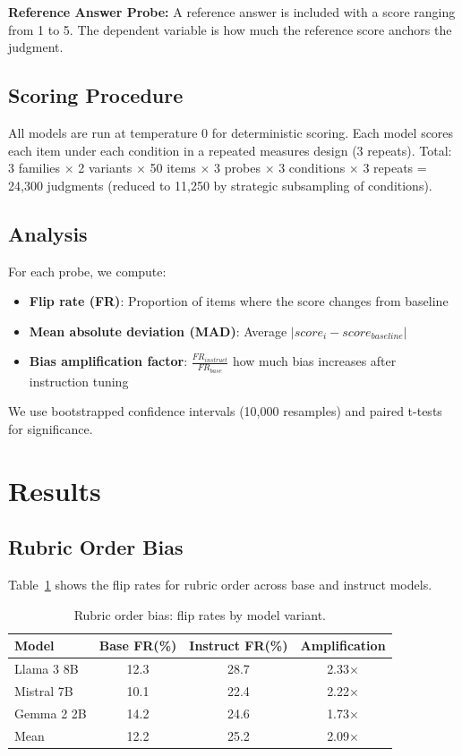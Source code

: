 \documentclass[11pt,twocolumn]{article}
\begin{document}
\textbf{Reference Answer Probe:} A reference answer is included with a score ranging from 1 to 5. The dependent variable is how much the reference score anchors the judgment.

\subsection{Scoring Procedure}
All models are run at temperature 0 for deterministic scoring. Each model scores each item under each condition in a repeated measures design (3 repeats). Total: 3 families $\times$ 2 variants $\times$ 50 items $\times$ 3 probes $\times$ 3 conditions $\times$ 3 repeats = 24,300 judgments (reduced to 11,250 by strategic subsampling of conditions).

\subsection{Analysis}
For each probe, we compute:
\begin{itemize}
    \item \textbf{Flip rate (FR)}: Proportion of items where the score changes from baseline
    \item \textbf{Mean absolute deviation (MAD)}: Average $|score_i - score_{baseline}|$
    \item \textbf{Bias amplification factor}: $\frac{FR_{instruct}}{FR_{base}}$  how much bias increases after instruction tuning
\end{itemize}

We use bootstrapped confidence intervals (10,000 resamples) and paired t-tests for significance.

\section{Results}

\subsection{Rubric Order Bias}
Table~\ref{tab:rubric_results} shows the flip rates for rubric order across base and instruct models.

\begin{table}[h]
\centering
\caption{Rubric order bias: flip rates by model variant.}
\label{tab:rubric_results}
\begin{tabular}{lccc}
\toprule
Model & Base FR(\%) & Instruct FR(\%) & Amplification \\
\midrule
Llama 3 8B & 12.3 & 28.7 & 2.33$\times$ \\
Mistral 7B & 10.1 & 22.4 & 2.22$\times$ \\
Gemma 2 2B & 14.2 & 24.6 & 1.73$\times$ \\
\midrule
Mean & 12.2 & 25.2 & 2.09$\times$ \\
\bottomrule
\end{tabular}
\end{table}
\end{document}
